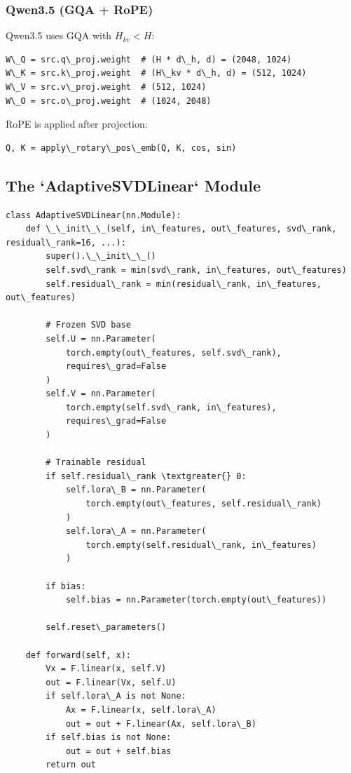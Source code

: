 \subsubsection{Qwen3.5 (GQA + RoPE)}

Qwen3.5 uses GQA with $H_{kv} < H$:

\begin{lstlisting}
W\_Q = src.q\_proj.weight  # (H * d\_h, d) = (2048, 1024)
W\_K = src.k\_proj.weight  # (H\_kv * d\_h, d) = (512, 1024)
W\_V = src.v\_proj.weight  # (512, 1024)
W\_O = src.o\_proj.weight  # (1024, 2048)
\end{lstlisting}

RoPE is applied after projection:

\begin{lstlisting}
Q, K = apply\_rotary\_pos\_emb(Q, K, cos, sin)
\end{lstlisting}

\subsection{The `AdaptiveSVDLinear` Module}

\begin{lstlisting}
class AdaptiveSVDLinear(nn.Module):
    def \_\_init\_\_(self, in\_features, out\_features, svd\_rank, residual\_rank=16, ...):
        super().\_\_init\_\_()
        self.svd\_rank = min(svd\_rank, in\_features, out\_features)
        self.residual\_rank = min(residual\_rank, in\_features, out\_features)
        
        # Frozen SVD base
        self.U = nn.Parameter(
            torch.empty(out\_features, self.svd\_rank),
            requires\_grad=False
        )
        self.V = nn.Parameter(
            torch.empty(self.svd\_rank, in\_features),
            requires\_grad=False
        )
        
        # Trainable residual
        if self.residual\_rank \textgreater{} 0:
            self.lora\_B = nn.Parameter(
                torch.empty(out\_features, self.residual\_rank)
            )
            self.lora\_A = nn.Parameter(
                torch.empty(self.residual\_rank, in\_features)
            )
        
        if bias:
            self.bias = nn.Parameter(torch.empty(out\_features))
        
        self.reset\_parameters()
    
    def forward(self, x):
        Vx = F.linear(x, self.V)
        out = F.linear(Vx, self.U)
        if self.lora\_A is not None:
            Ax = F.linear(x, self.lora\_A)
            out = out + F.linear(Ax, self.lora\_B)
        if self.bias is not None:
            out = out + self.bias
        return out
\end{lstlisting}


